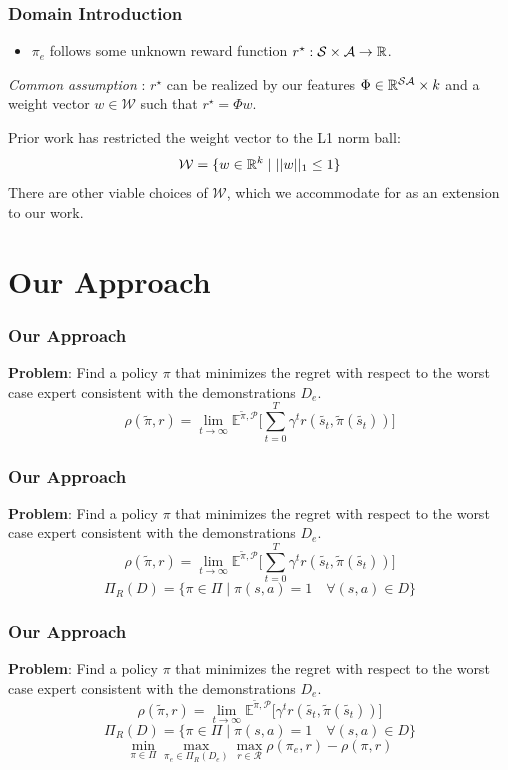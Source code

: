 \documentclass{beamer}
\begin{document}
\begin{frame}
	\frametitle{Domain Introduction}
\begin{itemize}
	\item $\pi_e$ follows some unknown reward function $r^\star : \mathcal{S} \times \mathcal{A} \to \mathbb{R}$.
\end{itemize}
	\emph{Common assumption} : $r^\star$ can be realized by our features $\Phi \in \mathbb{R}^{\mathcal{S}\mathcal{A}} \times k$
	and a weight vector $w \in \mathcal{W}$ such that $r^\star = \Phi w$.

	Prior work has restricted the weight vector to the L1 norm ball:
	\[ \mathcal{W} = \lbrace w \in \mathbb{R}^k \mid \lvert \lvert w \rvert \rvert_1 \leq 1 \rbrace \]
	There are other viable choices of $\mathcal{W}$, which we accommodate for as an extension to our work.
\end{frame}


\section*{Our Approach}



\begin{frame}
	\frametitle{Our Approach}
	\textbf{Problem}: Find a policy $\pi$ that minimizes the regret with respect to the worst case expert consistent with the demonstrations $D_e$.
	\[ \rho(\tilde{\pi}, r) = \lim_{t \to \infty} \mathbb{E}^{\tilde{\pi}, \mathcal{P}} \lbrack \sum_{t=0}^T \gamma^t r(\tilde{s_t}, \tilde{\pi}(\tilde{s_t})) \rbrack \]
\end{frame}

\begin{frame}
	\frametitle{Our Approach}
	\textbf{Problem}: Find a policy $\pi$ that minimizes the regret with respect to the worst case expert consistent with the demonstrations $D_e$.
	\[ \rho(\tilde{\pi}, r) = \lim_{t \to \infty} \mathbb{E}^{\tilde{\pi}, \mathcal{P}} \lbrack \sum_{t=0}^T \gamma^t r(\tilde{s_t}, \tilde{\pi}(\tilde{s_t})) \rbrack \]
	\[ \Pi_R(D) = \lbrace \pi \in \Pi \mid \pi(s,a) = 1 \quad \forall (s,a) \in D \rbrace \]
\end{frame}


\begin{frame}
	\frametitle{Our Approach}
	\textbf{Problem}: Find a policy $\pi$ that minimizes the regret with respect to the worst case expert consistent with the demonstrations $D_e$.
	\[ \rho(\tilde{\pi}, r) = \lim_{t \to \infty} \mathbb{E}^{\tilde{\pi}, \mathcal{P}} \lbrack \gamma^t r(\tilde{s_t}, \tilde{\pi}(\tilde{s_t})) \rbrack \]
	\[ \Pi_R(D) = \lbrace \pi \in \Pi \mid \pi(s,a) = 1 \quad \forall (s,a) \in D \rbrace \]
	\[ \min_{\pi \in \Pi} \max_{\pi_e \in \Pi_R(D_e)} \max_{r \in \mathcal{R}} \rho(\pi_e, r) - \rho(\pi, r)\]
\end{frame}
\end{document}
